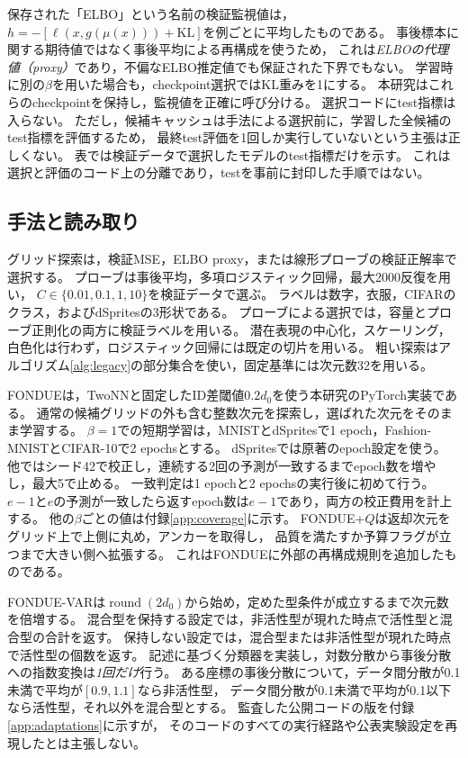 \documentclass[11pt,a4paper]{ltjsarticle}
\begin{document}
保存された「ELBO」という名前の検証監視値は，
$h=-[\ell(x,g(\mu(x)))+\mathrm{KL}]$を例ごとに平均したものである。
事後標本に関する期待値ではなく事後平均による再構成を使うため，
これは\emph{ELBOの代理値（proxy）}であり，不偏なELBO推定値でも保証された下界でもない。
学習時に別の$\beta$を用いた場合も，checkpoint選択ではKL重みを1にする。
本研究はこれらのcheckpointを保持し，監視値を正確に呼び分ける。
選択コードにtest指標は入らない。
ただし，候補キャッシュは手法による選択前に，学習した全候補のtest指標を評価するため，
最終test評価を1回しか実行していないという主張は正しくない。
表では検証データで選択したモデルのtest指標だけを示す。
これは選択と評価のコード上の分離であり，testを事前に封印した手順ではない。

\subsection{手法と読み取り}\label{sec:methods}
グリッド探索は，検証MSE，ELBO proxy，または線形プローブの検証正解率で選択する。
プローブは事後平均，多項ロジスティック回帰，最大2000反復を用い，
$C\in\{0.01,0.1,1,10\}$を検証データで選ぶ。
ラベルは数字，衣服，CIFARのクラス，およびdSpritesの3形状である。
プローブによる選択では，容量とプローブ正則化の両方に検証ラベルを用いる。
潜在表現の中心化，スケーリング，白色化は行わず，ロジスティック回帰には既定の切片を用いる。
粗い探索はアルゴリズム\ref{alg:legacy}の部分集合を使い，固定基準には次元数32を用いる。

FONDUEは，TwoNNと固定したID差閾値$0.2d_0$を使う本研究のPyTorch実装である。
通常の候補グリッドの外も含む整数次元を探索し，選ばれた次元をそのまま学習する。
$\beta=1$での短期学習は，MNISTとdSpritesで1 epoch，Fashion-MNISTとCIFAR-10で2 epochsとする。
dSpritesでは原著のepoch設定を使う。
他ではシード42で校正し，連続する2回の予測が一致するまでepoch数を増やし，最大5で止める。
一致判定は1 epochと2 epochsの実行後に初めて行う。
$e-1$と$e$の予測が一致したら返すepoch数は$e-1$であり，両方の校正費用を計上する。
他の$\beta$ごとの値は付録\ref{app:coverage}に示す。
FONDUE+$Q$は返却次元をグリッド上で上側に丸め，アンカーを取得し，
品質を満たすか予算フラグが立つまで大きい側へ拡張する。
これはFONDUEに外部の再構成規則を追加したものである。

FONDUE-VARは$\operatorname{round}(2d_0)$から始め，定めた型条件が成立するまで次元数を倍増する。
混合型を保持する設定では，非活性型が現れた時点で活性型と混合型の合計を返す。
保持しない設定では，混合型または非活性型が現れた時点で活性型の個数を返す。
記述に基づく分類器を実装し，対数分散から事後分散への指数変換は\emph{1回だけ}行う。
ある座標の事後分散について，データ間分散が0.1未満で平均が$[0.9,1.1]$なら非活性型，
データ間分散が0.1未満で平均が0.1以下なら活性型，それ以外を混合型とする。
監査した公開コードの版を付録\ref{app:adaptations}に示すが，
そのコードのすべての実行経路や公表実験設定を再現したとは主張しない。
\end{document}
